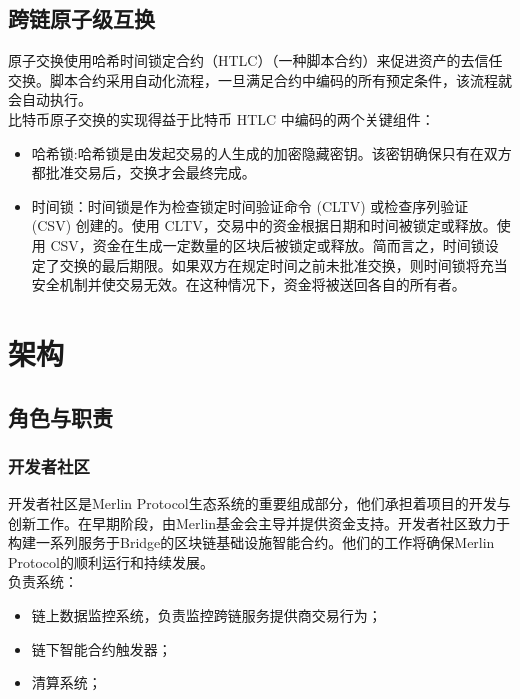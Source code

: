 \documentclass{article}
\begin{document}
\subsection{跨链原子级互换}
\par 原子交换使用哈希时间锁定合约（HTLC）（一种脚本合约）来促进资产的去信任交换\cite{lamportclocks}。脚本合约采用自动化流程，一旦满足合约中编码的所有预定条件，该流程就会自动执行。\\
比特币原子交换的实现得益于比特币 HTLC 中编码的两个关键组件：
\begin{itemize}
    \item 哈希锁:哈希锁是由发起交易的人生成的加密隐藏密钥。该密钥确保只有在双方都批准交易后，交换才会最终完成。
    \item 时间锁：时间锁是作为检查锁定时间验证命令 (CLTV) 或检查序列验证 (CSV) 创建的。使用 CLTV，交易中的资金根据日期和时间被锁定或释放。使用 CSV，资金在生成一定数量的区块后被锁定或释放。简而言之，时间锁设定了交换的最后期限。如果双方在规定时间之前未批准交换，则时间锁将充当安全机制并使交易无效。在这种情况下，资金将被送回各自的所有者。
\end{itemize}
\section{架构}
\subsection{角色与职责}
\subsubsection{开发者社区}
\par 开发者社区是Merlin Protocol生态系统的重要组成部分，他们承担着项目的开发与创新工作。在早期阶段，由Merlin基金会主导并提供资金支持。开发者社区致力于构建一系列服务于Bridge的区块链基础设施智能合约。他们的工作将确保Merlin Protocol的顺利运行和持续发展。\\
负责系统：
\begin{itemize}
    \item 链上数据监控系统，负责监控跨链服务提供商交易行为；
    \item 链下智能合约触发器；
    \item 清算系统；
\end{itemize}
\end{document}
